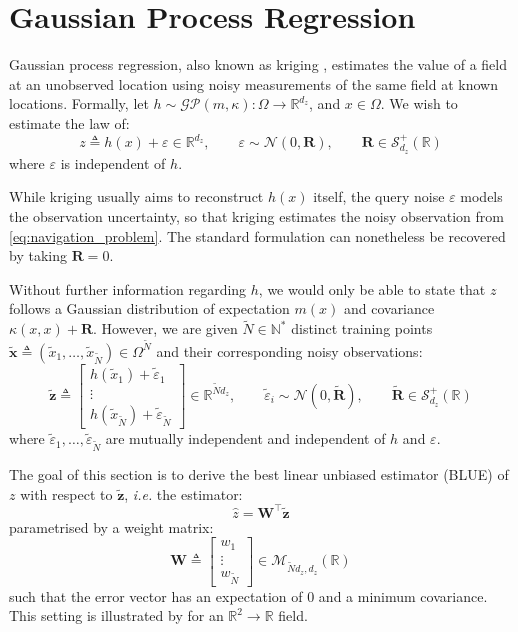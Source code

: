 \section{Gaussian Process Regression}\label{sec:kriging}

Gaussian process regression, also known as kriging \cite{bib:Matheron,bib:Rasmussen-regression,bib:GP-intro}, estimates the value of a field at an unobserved location using noisy measurements of the same field at known locations. Formally, let $h\sim\mathcal{GP}(m,\kappa):\Omega\to\mathbb{R}^{d_z}$, and $x\in\Omega$. We wish to estimate the law of:
\begin{equation}
	z\triangleq h(x)+\varepsilon\in\mathbb{R}^{d_z},\qquad\varepsilon\sim\mathcal{N}(0,\mathbf{R}),\qquad \mathbf{R}\in\mathcal{S}_{d_z}^+(\mathbb{R})
\end{equation}
where $\varepsilon$ is independent of $h$.

While kriging usually aims to reconstruct $h(x)$ itself, the query noise $\varepsilon$ models the observation uncertainty, so that kriging estimates the noisy observation from \eqref{eq:navigation_problem}. The standard formulation can nonetheless be recovered by taking $\mathbf{R}=0$.

Without further information regarding $h$, we would only be able to state that $z$ follows a Gaussian distribution of expectation $m(x)$ and covariance $\kappa(x,x)+\mathbf{R}$. However, we are given $\tilde{N}\in\mathbb{N}^*$ distinct training points $\tilde{\mathbf{x}}\triangleq(\tilde{x}_1,\dots,\tilde{x}_{\tilde{N}})\in\Omega^{\tilde{N}}$ and their corresponding noisy observations:
\begin{equation}
	\tilde{\mathbf{z}}\triangleq\begin{bmatrix}
		h(\tilde{x}_1)+\tilde{\varepsilon}_1\\\vdots\\h(\tilde{x}_{\tilde{N}})+\tilde{\varepsilon}_{\tilde{N}}
	\end{bmatrix}\in\mathbb{R}^{\tilde{N}d_z},\qquad\tilde{\varepsilon}_i\sim\mathcal{N}(0,\tilde{\mathbf{R}}),\qquad\tilde{\mathbf{R}}\in\mathcal{S}_{d_z}^+(\mathbb{R})
\end{equation}
where $\tilde{\varepsilon}_1,\dots,\tilde{\varepsilon}_{\tilde{N}}$ are mutually independent and independent of $h$ and $\varepsilon$.

The goal of this section is to derive the best linear unbiased estimator (BLUE) of $z$ with respect to $\tilde{\mathbf{z}}$, \textit{i.e.} the estimator:
\begin{equation}
	\hat{z}=\mathbf{W}^\top\tilde{\mathbf{z}}
\end{equation}
parametrised by a weight matrix:
\begin{equation}
	\mathbf{W}\triangleq\begin{bmatrix}
	w_1\\\vdots\\w_{\tilde{N}}
	\end{bmatrix}\in\mathcal{M}_{\tilde{N}d_z,d_z}(\mathbb{R})
\end{equation}
such that the error vector has an expectation of $0$ and a minimum covariance. This setting is illustrated by  for an $\mathbb{R}^2\to\mathbb{R}$ field.

